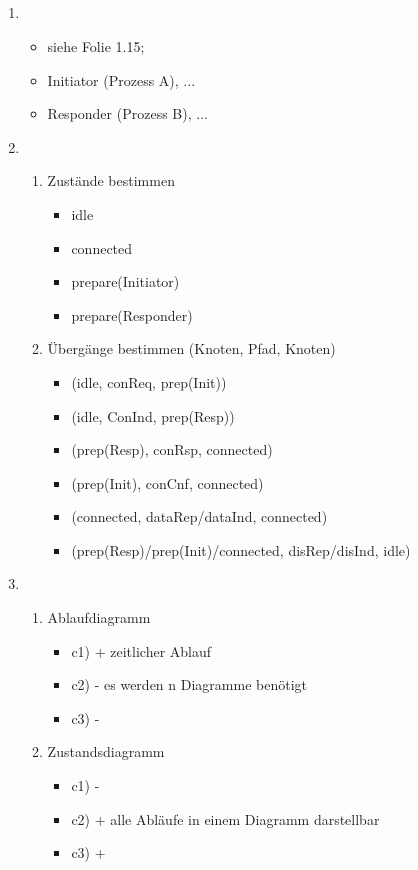 \subsection{}
\begin{enumerate}
	\item
	\begin{itemize}
		\item siehe Folie 1.15; 
		\item Initiator (Prozess A), ...
		\item Responder (Prozess B), ...
	\end{itemize}
	\item
	\begin{enumerate}
		\item Zustände bestimmen
		\begin{itemize}
			\item idle
			\item connected
			\item prepare(Initiator)
			\item prepare(Responder)
		\end{itemize}
		\item Übergänge bestimmen (Knoten, Pfad, Knoten)
		\begin{itemize}
			\item (idle, conReq, prep(Init))
			\item (idle, ConInd, prep(Resp))
			\item (prep(Resp), conRsp, connected)
			\item (prep(Init), conCnf, connected)
			\item (connected, dataRep/dataInd, connected) 
			\item (prep(Resp)/prep(Init)/connected, disRep/disInd, idle)
		\end{itemize}
	\end{enumerate}
	\item
	\begin{enumerate}
		\item Ablaufdiagramm
		\begin{itemize}
			\item c1) + zeitlicher Ablauf
			\item c2) - es werden n Diagramme benötigt
			\item c3) - 
		\end{itemize}
		\item Zustandsdiagramm
		\begin{itemize}
			\item c1) - 
			\item c2) + alle Abläufe in einem Diagramm darstellbar
			\item c3) + 
		\end{itemize}
	\end{enumerate}
\end{enumerate}

